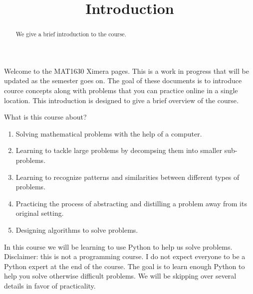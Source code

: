 \documentclass{ximera}
\title{Introduction}
\begin{document}
  
\begin{abstract}  
We give a brief introduction to the course.
\end{abstract}  
\maketitle

Welcome to the MAT1630 Ximera pages. This is a work in progress that will be updated as the semester goes on. The goal of these documents is to introduce cource concepts along with problems that you can practice online in a single location. 
This introduction is designed to give a brief overview of the course.

What is this course about?

\begin{enumerate}
	\item Solving mathematical problems with the help of a computer.
	\item Learning to tackle large problems by decompsing them into smaller sub-problems.
	\item Learning to recognize patterns and similarities between different types of problems.
	\item Practicing the process of abstracting and distilling a problem away from its original setting.
	\item Designing algorithms to solve problems.
\end{enumerate}

In this course we will be learning to use Python to help us solve problems. Disclaimer: this is not a programming course. I do not expect everyone to be a Python expert at the end of the course. The goal is to learn enough Python to help you solve otherwise difficult problems. We will be skipping over several details in favor of practicality. 
\end{document}
